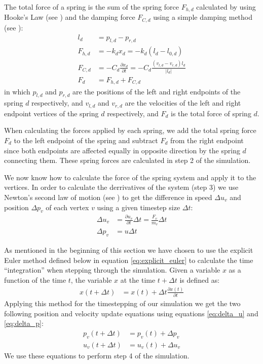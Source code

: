 \documentclass[11pt]{article}
\providecommand{\abs}[1]{\left \lvert #1 \right \rvert}
\begin{document}
The total force of a spring is the sum of the spring force $F_{h,d}$
calculated by using Hooke's Law (see \cite[p.~439]{Young:2010})
and the damping force $F_{C,d}$ using a simple damping method (see
\cite[p.~457]{Young:2010}): \begin{align} \nonumber l_d &= p_{l,d} -
p_{r,d} \\ \label{eq:hooke} F_{h,d} &= -k_d x_d = -k_d (l_d - l_{0,d}) \\
\label{eq:damping} F_{C,d} &= -C_d \frac{\partial x_d}{ \partial t} = - C_d
\frac{\left(v_{l,d} - v_{r,d}\right) l_d}{\abs{l_d}} \\ F_d &= F_{h,d} +
F_{C,d} \end{align} \todo{Maybe add direction correction: $F_d \cdot (-l_d
/ \abs{l_d})$} in which $p_{l,d}$ and $p_{r,d}$ are the positions of the
left and right endpoints of the spring $d$ respectively, and $v_{l,d}$ and
$v_{r,d}$ are the velocities of the left and right endpoint vertices of the
spring $d$ respectively, and $F_d$ is the total force of spring $d$.

When calculating the forces applied by each spring, we add the total spring
force $F_d$ to the left endpoint of the spring and subtract $F_d$ from the
right endpoint since both endpoints are affected equally in opposite direction
by the spring $d$ connecting them. These spring forces are calculated in step
2 of the simulation.

We now know how to calculate the force of the spring system and apply it to
the vertices. In order to calculate the derrivatives of the system (step 3) we
use Newton's second law of motion (see \cite[p.~112-115]{Young:2010}) to get
the difference in speed $\Delta u_v$ and position $\Delta p_v$ of each vertex
$v$ using a given timestep size $\Delta t$: \begin{align} \label{eq:delta_u}
\Delta u_v &= \frac{\partial u_v}{\partial t} \Delta t = \frac{F_v}{m_v}
\Delta t \\ \label{eq:delta_p} \Delta p_v &= u \Delta t \end{align}

As mentioned in the beginning of this section we have chosen to use the
explicit Euler method defined below in equation \ref{eq:explicit_euler}
to calculate the time ``integration'' \cite{Flaherty} when stepping through
the simulation. Given a variable $x$ as a function of the time $t$, the
variable $x$ at the time $t + \Delta t$ is defined as: \begin{align}
\label{eq:explicit_euler} x(t+\Delta t) &= x(t) + \Delta t \frac{\partial
x(t)}{\partial t} \end{align} Applying this method for the timestepping
of our simulation we get the two following position and velocity update
equations using equations \ref{eq:delta_u} and \ref{eq:delta_p}: \begin{align}
p_v(t+\Delta t) &= p_v(t) + \Delta p_v \\ u_v(t+\Delta t) &= u_v(t) + \Delta
u_v \end{align} We use these equations to perform step 4 of the simulation.
\end{document}
